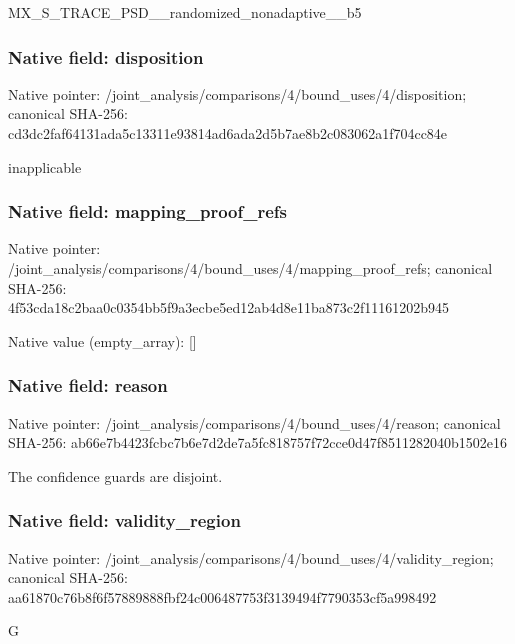 \documentclass[10pt,a4paper]{article}
\begin{document}
\begingroup\raggedright\sloppy MX\_\allowbreak{}S\_\allowbreak{}TRACE\_\allowbreak{}PSD\_\allowbreak{}\_\allowbreak{}randomized\_\allowbreak{}nonadaptive\_\allowbreak{}\_\allowbreak{}b5\par\endgroup

\subsubsection{Native field: disposition}
Native pointer: /joint\_\allowbreak{}analysis/comparisons/4/bound\_\allowbreak{}uses/4/disposition; canonical SHA-256: cd3dc2faf64131ada5c13311e93814ad6ada2d5b7ae8b2c083062a1f704cc84e

\begingroup\raggedright\sloppy inapplicable\par\endgroup

\subsubsection{Native field: mapping\_\allowbreak{}proof\_\allowbreak{}refs}
Native pointer: /joint\_\allowbreak{}analysis/comparisons/4/bound\_\allowbreak{}uses/4/mapping\_\allowbreak{}proof\_\allowbreak{}refs; canonical SHA-256: 4f53cda18c2baa0c0354bb5f9a3ecbe5ed12ab4d8e11ba873c2f11161202b945

Native value (empty\_\allowbreak{}array): []

\subsubsection{Native field: reason}
Native pointer: /joint\_\allowbreak{}analysis/comparisons/4/bound\_\allowbreak{}uses/4/reason; canonical SHA-256: ab66e7b4423fcbc7b6e7d2de7a5fc818757f72cce0d47f8511282040b1502e16

\begingroup\raggedright\sloppy The confidence guards are disjoint.\par\endgroup

\subsubsection{Native field: validity\_\allowbreak{}region}
Native pointer: /joint\_\allowbreak{}analysis/comparisons/4/bound\_\allowbreak{}uses/4/validity\_\allowbreak{}region; canonical SHA-256: aa61870c76b8f6f57889888fbf24c006487753f3139494f7790353cf5a998492

\begingroup\raggedright\sloppy G\par\endgroup
\end{document}
